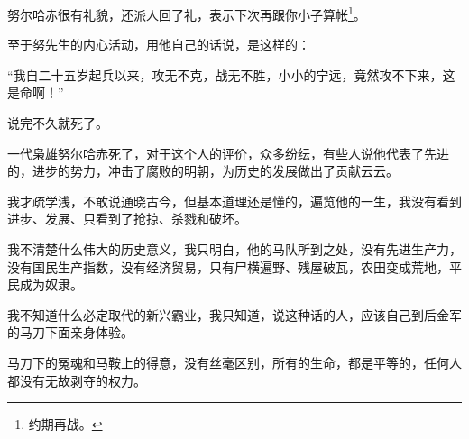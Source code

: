 \begin{multicols}{\theparacolNo}
		努尔哈赤很有礼貌，还派人回了礼，表示下次再跟你小子算帐\footnote{约期再战。}。

		至于努先生的内心活动，用他自己的话说，是这样的：

		“我自二十五岁起兵以来，攻无不克，战无不胜，小小的宁远，竟然攻不下来，这是命啊！”

		说完不久就死了。

		一代枭雄努尔哈赤死了，对于这个人的评价，众多纷纭，有些人说他代表了先进的，进步的势力，冲击了腐败的明朝，为历史的发展做出了贡献云云。

		我才疏学浅，不敢说通晓古今，但基本道理还是懂的，遍览他的一生，我没有看到进步、发展、只看到了抢掠、杀戮和破坏。

		我不清楚什么伟大的历史意义，我只明白，他的马队所到之处，没有先进生产力，没有国民生产指数，没有经济贸易，只有尸横遍野、残屋破瓦，农田变成荒地，平民成为奴隶。

		我不知道什么必定取代的新兴霸业，我只知道，说这种话的人，应该自己到后金军的马刀下面亲身体验。

		马刀下的冤魂和马鞍上的得意，没有丝毫区别，所有的生命，都是平等的，任何人都没有无故剥夺的权力。
		\ifnum{}
	\end{multicols}
\fi
